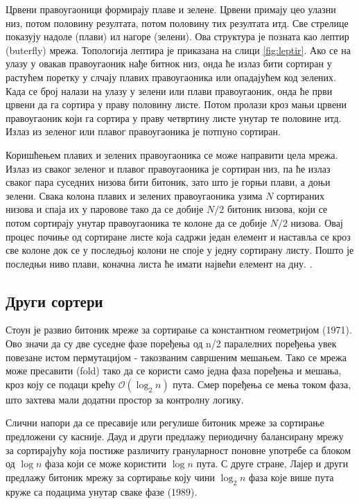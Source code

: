 \documentclass[12pt, a4paper]{article}
\theoremstyle{definition}
\begin{document}
Црвени правоугаоници формирају плаве и зелене. Црвени примају цео улазни низ, потом половину резултата, потом половину тих резултата итд. Све стрелице показују надоле (плави) ил нагоре (зелени). Ова структура је позната као лептир (buterfly) мрежа. Топологија лептира је приказана на слици \ref{fig:leptir}. Ако се на улазу у овакав правоугаоник нађе битнок низ, онда ће излаз бити сортиран у растућем поретку у слчају плавих правоугаоника или опадајућем код зелених. Када се број налази на улазу у зелени или плави правоугаоник, онда ће први црвени да га сортира у праву половину листе. Потом пролази кроз мањи црвени правоугаоник који га сортира у праву четвртину листе унутар те половине итд. Излаз из зеленог или плавог правоугаоника је потпуно сортиран.

Коришћењем плавих и зелених правоугаоника се може направити цела мрежа. Излаз из сваког зеленог и плавог правоугаоника је сортиран низ, па ће излаз сваког пара суседних низова бити битоник, зато што је горњи плави, а доњи зелени. Свака колона плавих и зелених правоугаоника узима $N$ сортираних низова и спаја их у паровове тако да се добије $N/2$ битоник низова, који се потом сортирају унутар правоугаоника те колоне да се добије $N/2$ низова. Овај процес почиње од сортиране листе која садржи један елемент и наставља се кроз све колоне док се у последњој колони не споје у једну сортирану листу. Пошто је последњи ниво плави, коначна листа ће имати највећи елемент на дну. \cite{wiki_bitonic}.

\subsection{Други сортери}
Стоун \cite{stone} је развио битоник мреже за сортирање са константном геометријом (1971). Ово значи да су две суседне фазе поређења од n/2 паралелних поређења увек повезане истом пермутацијом - такозваним савршеним мешањем. Тако се мрежа може пресавити (fold) тако да се користи само једна фаза поређења и мешања, кроз коју се подаци крећу $\mathcal{O}(\log_{2} n)$ пута. Смер поређења се мења током фаза, што захтева мали додатни простор за контролну логику.

Слични напори да се пресавије или регулише битоник мреже за сортирање предложени су касније. Дауд и други \cite{dowd} предлажу периодичну балансирану мрежу за сортирајућу која постиже различиту грануларност поновне употребе са блоком од $\log n$ фаза који се може користити $\log n$ пута. С друге стране, Лајер и други \cite{layer07} предлажу битоник мрежу за сортирање коју чини $\log_{2} n$ фаза које више пута круже са подацима унутар сваке фазе (1989).
\end{document}

